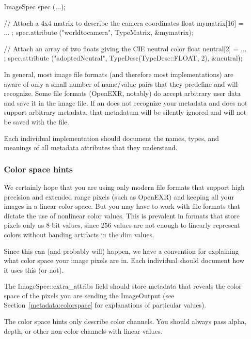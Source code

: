 \begin{code}
        ImageSpec spec (...);

        // Attach a 4x4 matrix to describe the camera coordinates
        float mymatrix[16] = { ... };
        spec.attribute ("worldtocamera", TypeMatrix, &mymatrix);

        // Attach an array of two floats giving the CIE neutral color
        float neutral[2] = { ... };
        spec.attribute ("adoptedNeutral", TypeDesc(TypeDesc::FLOAT, 2), &neutral);
\end{code}

In general, most image file formats (and therefore most \ImageOutput
implementations) are aware of only a small number of name/value pairs
that they predefine and will recognize.  Some file formats (OpenEXR,
notably) do accept arbitrary user data and save it in the image file.
If an \ImageOutput does not recognize your metadata and does not support
arbitrary metadata, that metadatum will be silently ignored and will not
be saved with the file.

Each individual \ImageOutput implementation should document the names,
types, and meanings of all metadata attributes that they understand.


\subsubsection{Color space hints}

We certainly hope that you are using only modern file formats that
support high precision and extended range pixels (such as OpenEXR) and
keeping all your images in a linear color space.  But you may have to
work with file formats that dictate the use of nonlinear color values.
This is prevalent in formats that store pixels only as 8-bit values,
since 256 values are not enough to linearly represent colors without
banding artifacts in the dim values.

Since this can (and probably will) happen, we have a convention
for explaining what color space your image pixels are
in.  Each individual \ImageOutput should document how it uses this (or
not).

The {\cf ImageSpec::extra_attribs} field should store metadata that
reveals the color space of the pixels you are sending the ImageOutput
(see Section~\ref{metadata:colorspace} for explanations of
particular values).

\noindent The color space hints only describe color channels.  You should always
pass alpha, depth, or other non-color channels with linear values.


